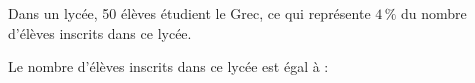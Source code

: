 
Dans un lycée, 50 élèves étudient le Grec, ce qui représente $4\,\%$ du nombre d'élèves inscrits dans ce lycée.

Le nombre d'élèves inscrits dans ce lycée est égal à :


